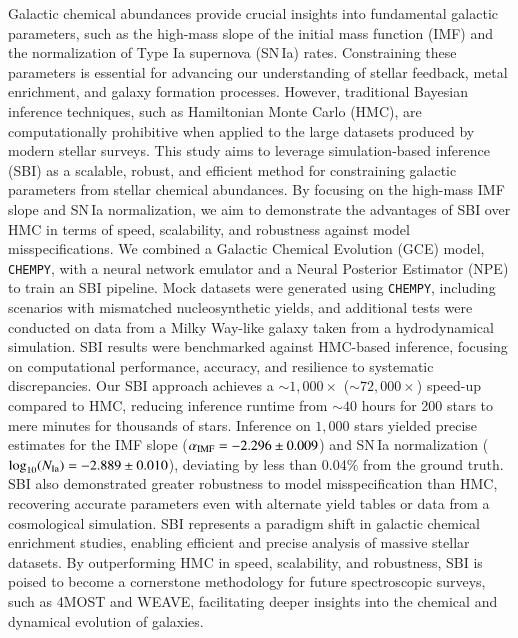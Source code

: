 \documentclass{aa}
\begin{document}
 \abstract
   {Galactic chemical abundances provide crucial insights into fundamental galactic parameters, such as the high-mass slope of the initial mass function (IMF) and the normalization of Type Ia supernova (SN\,Ia) rates. Constraining these parameters is essential for advancing our understanding of stellar feedback, metal enrichment, and galaxy formation processes. However, traditional Bayesian inference techniques, such as Hamiltonian Monte Carlo (HMC), are computationally prohibitive when applied to the large datasets produced by modern stellar surveys.}
   {This study aims to leverage simulation-based inference (SBI) as a scalable, robust, and efficient method for constraining galactic parameters from stellar chemical abundances. By focusing on the high-mass IMF slope and SN\,Ia normalization, we aim to demonstrate the advantages of SBI over HMC in terms of speed, scalability, and robustness against model misspecifications.}
   {We combined a Galactic Chemical Evolution (GCE) model, \texttt{CHEMPY}, with a neural network emulator and a Neural Posterior Estimator (NPE) to train an SBI pipeline. Mock datasets were generated using \texttt{CHEMPY}, including scenarios with mismatched nucleosynthetic yields, and additional tests were conducted on data from a Milky Way-like galaxy taken from a hydrodynamical simulation. SBI results were benchmarked against HMC-based inference, focusing on computational performance, accuracy, and resilience to systematic discrepancies.}
   {Our SBI approach achieves a $\sim1,000\times$ ($\sim72,000\times$) speed-up compared to HMC, reducing inference runtime from $\sim40$ hours for 200 stars to mere minutes for thousands of stars. Inference on $1,000$ stars yielded precise estimates for the IMF slope ($\alpha_{\rm IMF} = -2.296 \pm 0.009$) and SN\,Ia normalization ($\log_{10}(N_{\rm Ia}) = -2.889 \pm 0.010$), deviating by less than 0.04\% from the ground truth. SBI also demonstrated greater robustness to model misspecification than HMC, recovering accurate parameters even with alternate yield tables or data from a cosmological simulation.}
   {SBI represents a paradigm shift in galactic chemical enrichment studies, enabling efficient and precise analysis of massive stellar datasets. By outperforming HMC in speed, scalability, and robustness, SBI is poised to become a cornerstone methodology for future spectroscopic surveys, such as 4MOST and WEAVE, facilitating deeper insights into the chemical and dynamical evolution of galaxies.}
\end{document}
